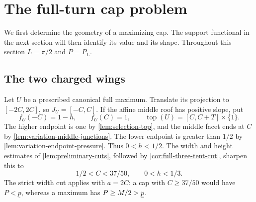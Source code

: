 \section{The full-turn cap problem}\label{sec:full-turn}

We first determine the geometry of a maximizing cap. The support
functional in the next section will then identify its value and its
shape. Throughout this section $L=\pi/2$ and $P=P_L$.

\subsection{The two charged wings}

Let $U$ be a prescribed canonical full maximum. Translate its
projection to $[-2C,2C]$, so $J_U=[-C,C]$. If the affine middle
roof has positive slope, put
\[
 f_U(-C)=1-h,\qquad f_U(C)=1,\qquad
 \operatorname{top}(U)=[C,C+T]\times\{1\}.
\]
The higher endpoint is one by \cref{lem:selection-top}, and the
middle facet ends at $C$ by \cref{lem:variation-middle-junctions}.
The lower endpoint is greater than $1/2$ by
\cref{lem:variation-endpoint-pressure}. Thus $0<h<1/2$.
The width and height estimates of \cref{lem:preliminary-cuts},
followed by \cref{cor:full-three-tent-cut}, sharpen this to
\begin{equation}\label{eq:tilted-parameter-range}
 1/2<C<37/50,\qquad 0<h<1/3.
\end{equation}
The strict width cut applies with $a=2C$: a cap with
$C\ge37/50$ would have $P<\underline p$, whereas a maximum has
$P\ge M/2>\underline p$.

